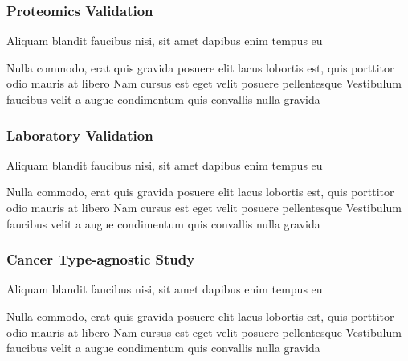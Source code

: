 \documentclass[
paper=landscape,
paper=160mm:90mm, %
fontsize=11pt, %
pagesize, %
parskip=half-, %
]{scrartcl} %
\theoremstyle{mythmstyle} %
\begin{document}
\clearpage

\subsubsection{Proteomics Validation}

\begin{outline}

\1 Aliquam blandit faucibus nisi, sit amet dapibus enim tempus eu

\2 Nulla commodo, erat quis gravida posuere
\1 elit lacus lobortis est, quis porttitor odio mauris at libero
\1 Nam cursus est eget velit posuere pellentesque
\1 Vestibulum faucibus velit a augue condimentum quis convallis nulla gravida

\end{outline}


\clearpage

\subsubsection{Laboratory Validation}

\begin{outline}

\1 Aliquam blandit faucibus nisi, sit amet dapibus enim tempus eu

\2 Nulla commodo, erat quis gravida posuere
\1 elit lacus lobortis est, quis porttitor odio mauris at libero
\1 Nam cursus est eget velit posuere pellentesque
\1 Vestibulum faucibus velit a augue condimentum quis convallis nulla gravida

\end{outline}


\clearpage

\subsubsection{Cancer Type-agnostic Study}

\begin{outline}

\1 Aliquam blandit faucibus nisi, sit amet dapibus enim tempus eu

\2 Nulla commodo, erat quis gravida posuere
\1 elit lacus lobortis est, quis porttitor odio mauris at libero
\1 Nam cursus est eget velit posuere pellentesque
\1 Vestibulum faucibus velit a augue condimentum quis convallis nulla gravida

\end{outline}
\end{document}
